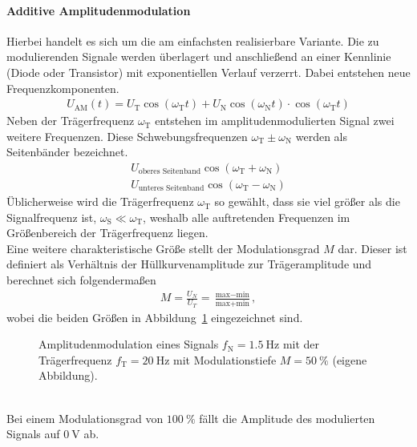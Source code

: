 \documentclass[a4paper,twoside,final]{article}
\begin{document}
\paragraph{Additive Amplitudenmodulation}
Hierbei handelt es sich um die am einfachsten realisierbare Variante. Die zu modulierenden Signale werden überlagert und anschließend an einer Kennlinie (Diode oder Transistor) mit exponentiellen Verlauf verzerrt. Dabei entstehen neue Frequenzkomponenten.
\begin{align}
  U_\text{AM}(t) = U_\text{T}\cos(\omega_\text{T}t) + U_\text{N}\cos(\omega_\text{N}t)\cdot\cos(\omega_\text{T}t)\label{eqn:AM_additiv}
\end{align}
Neben der Trägerfrequenz $\omega_\text{T}$ entstehen im amplitudenmodulierten Signal zwei weitere Frequenzen. Diese Schwebungsfrequenzen $\omega_\text{T} \pm \omega_\text{N}$ werden als Seitenbänder bezeichnet.
\begin{align}
  U_\text{oberes Seitenband}\cos(\omega_\text{T} + \omega_\text{N})\\
  U_\text{unteres Seitenband}\cos(\omega_\text{T} - \omega_\text{N})
\end{align}
Üblicherweise wird die Trägerfrequenz $\omega_\text{T}$ so gewählt, dass sie viel größer als die Signalfrequenz ist, $\omega_\text{S} \ll \omega_\text{T}$, weshalb alle auftretenden Frequenzen im Größenbereich der Trägerfrequenz liegen.\\
Eine weitere charakteristische Größe stellt der Modulationsgrad $M$ dar. Dieser ist definiert als Verhältnis der Hüllkurvenamplitude zur Trägeramplitude und berechnet sich folgendermaßen
\begin{align}
  M = \frac{U_N}{U_T} = \frac{\text{max}-\text{min}}{\text{max}+\text{min}},\label{eqn:Modulationsgrad}
\end{align}
wobei die beiden Größen in Abbildung~\ref{fig:Amplitudenmodulation} eingezeichnet sind.
\begin{figure}[htp]
    \centering
        
    \caption{Amplitudenmodulation eines Signals $f_\text{N} = \SI{1.5}{\hertz}$ mit der Trägerfrequenz $f_\text{T} = \SI{20}{\hertz}$ mit Modulationstiefe $M = \SI{50}{\percent}$ (eigene Abbildung).}
    \label{fig:Amplitudenmodulation}
\end{figure}\\
Bei einem Modulationsgrad von $\SI{100}{\percent}$ fällt die Amplitude des modulierten Signals auf $\SI{0}{\volt}$ ab.
\end{document}
